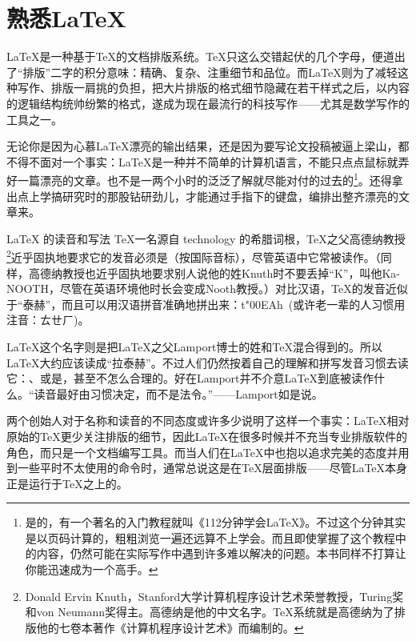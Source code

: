 \chapter{熟悉\LaTeX}
{\LaTeX}是一种基于{\TeX}的文档排版系统。{\TeX}只这么交错起伏的几个字母，便道出了“排版”二字的积分意味：精确、复杂、注重细节和品位。而{\LaTeX}则为了减轻这种写作、排版一肩挑的负担，把大片排版的格式细节隐藏在若干样式之后，以内容的逻辑结构统帅纷繁的格式，遂成为现在最流行的科技写作——尤其是数学写作的工具之一。

无论你是因为心慕{\LaTeX}漂亮的输出结果，还是因为要写论文投稿被逼上梁山，都不得不面对一个事实：{\LaTeX}是一种并不简单的计算机语言，不能只点点鼠标就弄好一篇漂亮的文章。也不是一两个小时的泛泛了解就尽能对付的过去的\footnote{是的，有一个著名的入门教程就叫《112分钟学会{\LaTeX}》。不过这个分钟其实是以页码计算的，粗粗浏览一遍还远算不上学会。而且即使掌握了这个教程中的内容，仍然可能在实际写作中遇到许多难以解决的问题。本书同样不打算让你能迅速成为一个高手。}。还得拿出点上学搞研究时的那股钻研劲儿，才能通过手指下的键盘，编排出整齐漂亮的文章来。

\begin{extread}{\LaTeX{} 的读音和写法}
    \TeX 一名源自 technology 的希腊词根\greektex，\TeX 之父高德纳教授\footnote{Donald Ervin Knuth，Stanford大学计算机程序设计艺术荣誉教授，Turing奖和von Neumann奖得主。高德纳是他的中文名字。\TeX 系统就是高德纳为了排版他的七卷本著作《计算机程序设计艺术》而编制的。}近乎固执地要求它的发音必须是（按国际音标）\textipa{[tEx]}，尽管英语中它常被读作\textipa{[tEk]}。（同样，高德纳教授也近乎固执地要求别人说他的姓Knuth时不要丢掉“K”，叫他Ka-NOOTH，尽管在英语环境他时长会变成Nooth教授。）对比汉语，\TeX 的发音近似于“泰赫”，而且可以用汉语拼音准确地拼出来：\textsf{t\char"00EAh}~(或许老一辈的人习惯用注音：ㄊㄝㄏ)。
    
    \LaTeX 这个名字则是把\LaTeX 之父Lamport博士的姓和\TeX 混合得到的。所以\LaTeX 大约应该读成“拉泰赫”。不过人们仍然按着自己的理解和拼写发音习惯去读它：\textipa{["la:tEk]}、\textipa{["leItEk]}或是\textipa{[la:"tEk]}，甚至不怎么合理的\textipa{["leItEks]}。好在Lamport并不介意\LaTeX 到底被读作什么。“读音最好由习惯决定，而不是法令。”——Lamport如是说。
    
    两个创始人对于名称和读音的不同态度或许多少说明了这样一个事实：\LaTeX 相对原始的\TeX 更少关注排版的细节，因此\LaTeX 在很多时候并不充当专业排版软件的角色，而只是一个文档编写工具。而当人们在\LaTeX 中也抱以追求完美的态度并用到一些平时不太使用的命令时，通常总说这是在\TeX 层面排版——尽管\LaTeX 本身正是运行于\TeX 之上的。
    
\end{extread}


